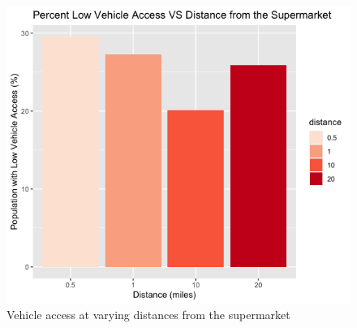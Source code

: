 \documentclass[letterpaper]{article} %
\begin{document}
\begin{figure}[ht!] 
	\caption{Vehicle access at varying distances from the supermarket \label{fig:vehicle access}}
	\centering
	\includegraphics[width=.6\paperwidth]{Figure_3.png}
\end{figure}
\end{document}
